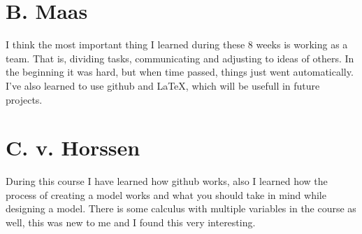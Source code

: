 \documentclass[a4paper, 11pt, notitlepage]{report}
\begin{document}
	\section{B. Maas}
	I think the most important thing I learned during these 8 weeks is working as a team. That is, dividing tasks, communicating and adjusting to ideas of others. In the beginning it was hard, but when time passed, things just went automatically. I've also learned to use github and LaTeX, which will be usefull in future projects.

\section{C. v. Horssen} During this course I have learned how github works, also I learned how the process of creating a model works and what you should take in mind while designing a model. There is some calculus with multiple variables in the course as well, this was new to me and I found this very interesting.





\end{document}
